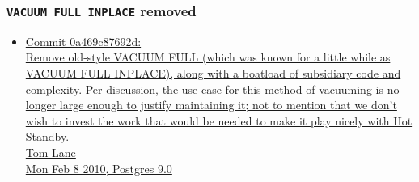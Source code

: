 % 
% 
% 

\begin{frame}
  \frametitle{\texttt{VACUUM FULL INPLACE} removed}
  \begin{itemize}
    \item {\linksize \href{https://git.postgresql.org/cgit/postgresql.git/commit/?id=0a469c87692d15a22eaa69d4b3a43dd8e278dd64}
      {Commit 0a469c87692d: \faExternalLink \\
      Remove old-style VACUUM FULL (which was known for a little while as
      VACUUM FULL INPLACE), along with a boatload of subsidiary code and complexity.
      Per discussion, the use case for this method of vacuuming is no longer large
      enough to justify maintaining it; not to mention that we don't wish to invest
      the work that would be needed to make it play nicely with Hot Standby. \\
      Tom Lane \\
      Mon Feb 8 2010, Postgres 9.0}}
  \end{itemize}
\end{frame}

